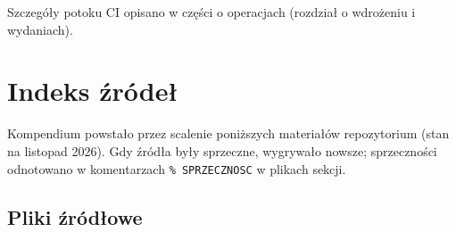 Szczegóły potoku CI opisano w części o operacjach (rozdział o wdrożeniu i wydaniach).

\chapter{Indeks źródeł}
\label{ch:zal-zrodla}

Kompendium powstało przez scalenie poniższych materiałów repozytorium
 (stan na listopad 2026). Gdy źródła były sprzeczne, wygrywało
nowsze; sprzeczności odnotowano w komentarzach \texttt{\% SPRZECZNOSC} w plikach
sekcji.

\section{Pliki źródłowe}

